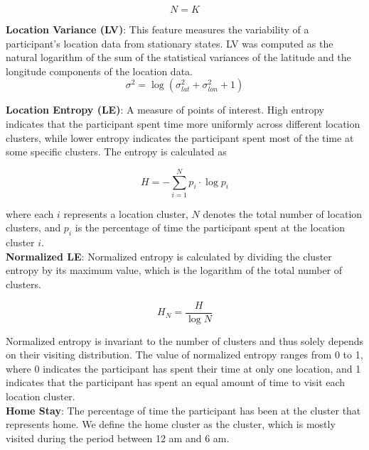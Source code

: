 \begin{equation}
\label{eq:saeb-num-places}
N = K
\end{equation}

\textbf{Location Variance (LV)}: This feature measures the variability of a participant’s location data from stationary states. LV was computed as the natural logarithm of the sum of the statistical variances of the latitude and the longitude components of the location data.\\

\begin{equation}
\label{eq:saeb-loc-var}
\sigma^2 = \log (\sigma^2_{lat} + \sigma^2_{lon} + 1) 
\end{equation}

\textbf{Location Entropy (LE)}: A measure of points of interest. High
entropy indicates that the participant spent time more uniformly across different location
clusters, while lower entropy indicates the participant spent most of the time at some
specific clusters. The entropy is calculated as 

\begin{equation}
\label{eq:saeb-num-places}
H = - \sum_{i=1}^N p_i \cdot \log p_i
\end{equation}

where each $i$ represents a location cluster, $N$ denotes the total number of location clusters, and $p_i$ is the percentage of time the participant spent at the location cluster $i$. \\

\textbf{Normalized LE}: Normalized entropy is calculated by dividing the cluster entropy by its maximum value, which is the logarithm of the total number of clusters. 

\begin{equation}
\label{eq:saeb-num-places}
H_N = \frac{H}{\log N}
\end{equation}

Normalized entropy is invariant to the number of clusters and thus solely depends on their visiting distribution. The value of normalized entropy ranges from 0 to 1, where 0 indicates the participant has spent their time at only one location, and 1 indicates that the participant has spent an equal amount of time to visit each location cluster.\\

\textbf{Home Stay}: The percentage of time the participant has been at the cluster that represents home. We define the home cluster as the cluster, which is mostly visited during the period between 12 am and 6 am.\\

